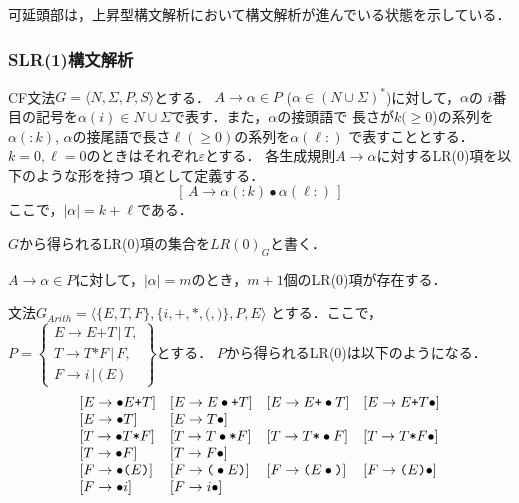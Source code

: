 \documentclass[a4j,dvipdfmx]{jbook}
\begin{document}
可延頭部は，上昇型構文解析において構文解析が進んでいる状態を示している．
\subsubsection{SLR(1)構文解析}

\begin{Def}
  CF文法$G=\langle N,\Sigma,P,S\rangle$とする．
$A\rightarrow\alpha\in P$ ($\alpha\in(N\cup\Sigma)^\ast$)に対して，$\alpha$の
$i$番目の記号を$\alpha(i)\in N\cup\Sigma$で表す．また，$\alpha$の接頭語で
長さが$k(\geq 0$)の系列を$\alpha(:k)$, $\alpha$の接尾語で長さ$\ell(\geq 0)$の系列を$\alpha(\ell:)$
で表すこととする．$k=0,\ell=0$のときはそれぞれ$\varepsilon$とする．
各生成規則$A\rightarrow\alpha$に対するLR(0)項を以下のような形を持つ
項として定義する．
\[[\,A\rightarrow\alpha(:k)\bullet\alpha(\ell:)\,]\]
ここで，$|\alpha|=k+\ell$である．

$G$から得られるLR(0)項の集合を$LR(0)_G$と書く．
\end{Def}

$A\rightarrow\alpha\in P$に対して，$|\alpha|=m$のとき，$m+1$個のLR(0)項が存在する．
\begin{Exmp}\label{ArithmeticExample}
  文法$G_{Arith}=\langle\{E,T,F\},\{i,\texttt{+},\texttt{*},\texttt{(},\texttt{)}\},P,E\rangle$
  とする．ここで，\\$P=\left\{\begin{array}{l}
    E\rightarrow E\texttt{+}T\,|\,T,\\
    T\rightarrow T\texttt{*}F\,|\,F,\\
  F\rightarrow i\,|\,\texttt{(}\,E\,\texttt{)}
  \end{array}\right\}$とする．
  $P$から得られるLR(0)は以下のようになる．
  \[\begin{array}{llll}
    [E\rightarrow\bullet E\texttt{+}T] & [E\rightarrow E\bullet\texttt{+}T]
    & [E\rightarrow E\texttt{+}\bullet T] & [E\rightarrow E\texttt{+}T\bullet]\\\relax
    [E\rightarrow\bullet T] & [E\rightarrow T\bullet]\\\relax
    [T\rightarrow\bullet T\texttt{*}F] & [T\rightarrow T\bullet\texttt{*}F]
    & [T\rightarrow T\texttt{*}\bullet F] & [T\rightarrow T\texttt{*}F\bullet]\\\relax
    [T\rightarrow\bullet F] & [T\rightarrow F\bullet]\\\relax
    [F\rightarrow\bullet\texttt{(}E\texttt{)}] & [F\rightarrow\texttt{(}\bullet E\texttt{)}]
    & [F\rightarrow\texttt{(}E\bullet\texttt{)}] & [F\rightarrow\texttt{(}E\texttt{)}\bullet]\\\relax
    [F\rightarrow\bullet i] & [F\rightarrow i\bullet]
  \end{array}\]
\end{Exmp}
\end{document}
